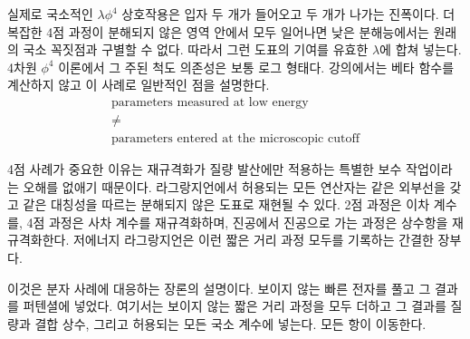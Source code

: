 실제로 국소적인 \(\lambda\phi^4\) 상호작용은 입자 두 개가 들어오고 두 개가 나가는 진폭이다. 더 복잡한 4점 과정이 분해되지 않은 영역 안에서 모두 일어나면 낮은 분해능에서는 원래의 국소 꼭짓점과 구별할 수 없다. 따라서 그런 도표의 기여를 유효한 \(\lambda\)에 합쳐 넣는다. 4차원 \(\phi^4\) 이론에서 그 주된 척도 의존성은 보통 로그 형태다. 강의에서는 베타 함수를 계산하지 않고 이 사례로 일반적인 점을 설명한다.
\begin{equation}
\begin{gathered}
\text{parameters measured at low energy}\\
\ne\\
\text{parameters entered at the microscopic cutoff}
\end{gathered}
\end{equation}

4점 사례가 중요한 이유는 재규격화가 질량 발산에만 적용하는 특별한 보수 작업이라는 오해를 없애기 때문이다. 라그랑지언에서 허용되는 모든 연산자는 같은 외부선을 갖고 같은 대칭성을 따르는 분해되지 않은 도표로 재현될 수 있다. 2점 과정은 이차 계수를, 4점 과정은 사차 계수를 재규격화하며, 진공에서 진공으로 가는 과정은 상수항을 재규격화한다. 저에너지 라그랑지언은 이런 짧은 거리 과정 모두를 기록하는 간결한 장부다.

\begin{classroomqa}
\end{classroomqa}

이것은 분자 사례에 대응하는 장론의 설명이다. 보이지 않는 빠른 전자를 풀고 그 결과를 퍼텐셜에 넣었다. 여기서는 보이지 않는 짧은 거리 과정을 모두 더하고 그 결과를 질량과 결합 상수, 그리고 허용되는 모든 국소 계수에 넣는다. 모든 항이 이동한다.

\begin{classroomqa}
\end{classroomqa}


